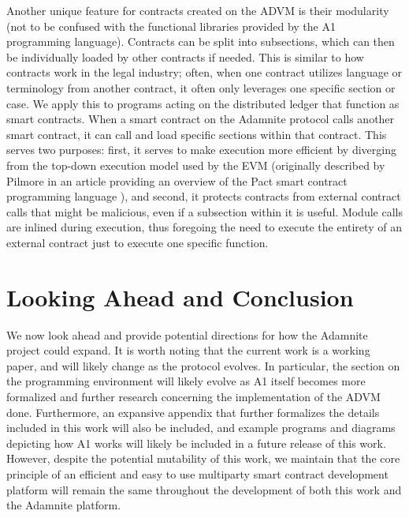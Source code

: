\documentclass[conference]{IEEEtran}
\begin{document}
Another unique feature for contracts created on the ADVM is their modularity (not to be confused with the functional libraries provided by the A1 programming language). Contracts can be split into subsections, which can then be individually loaded by other contracts if needed. This is similar to how contracts work in the legal industry; often, when one contract utilizes language or terminology from another contract, it often only leverages one specific section or case. We apply this to programs acting on the distributed ledger that function as smart contracts. When a smart contract on the Adamnite protocol calls another smart contract, it can call and load specific sections within that contract. This serves two purposes: first, it serves to make execution more efficient by diverging from the  top-down execution model used by the EVM (originally described by Pilmore in an article providing an overview of  the Pact smart contract programming language \cite{pilmore2019EVM}), and second, it protects contracts from external contract calls that might be malicious, even if a subsection within it is useful. Module calls are inlined during execution, thus foregoing the need to execute the entirety of an external contract just to execute one specific function. 


\section{Looking Ahead and Conclusion}
We now look ahead and provide potential directions for how the Adamnite project could expand. It is worth noting that the current work is a working paper, and will likely change as the protocol evolves. In particular, the section on the programming environment will likely evolve as A1 itself becomes more formalized and further research concerning the implementation of the ADVM done. Furthermore, an expansive appendix that further formalizes the details included in this work will also be included, and example programs and diagrams depicting how A1 works will likely be included in a future release of this work. However, despite the potential mutability of this work, we maintain that the core principle of an efficient and easy to use multiparty smart contract development platform will remain the same throughout the development of both this work and the Adamnite platform. 
\end{document}
